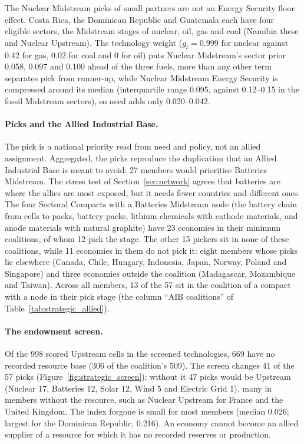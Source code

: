 The Nuclear Midstream picks of small partners are not an Energy Security floor effect. Costa Rica,
the Dominican Republic and Guatemala each have four eligible sectors, the Midstream stages of
nuclear, oil, gas and coal (Namibia these and Nuclear Upstream). The technology weight ($g_t=0.999$
for nuclear against 0.42 for gas, 0.02 for coal and 0 for oil) puts Nuclear Midstream's sector prior
0.058, 0.097 and 0.100 ahead of the three fuels, more than any other term separates pick from
runner-up, while Nuclear Midstream Energy Security is compressed around its median (interquartile
range 0.095, against 0.12--0.15 in the fossil Midstream sectors), so need adds only 0.020--0.042.

\paragraph{Picks and the Allied Industrial Base.} The pick is a national priority read from need
and policy, not an allied assignment. Aggregated, the picks reproduce the duplication that an Allied
Industrial Base is meant to avoid: 27 members would prioritise Batteries Midstream. The stress test of
Section~\ref{sec:network} agrees that batteries are where the allies are most exposed, but it needs
fewer countries and different ones. The four Sectoral Compacts with a Batteries Midstream node (the
battery chain from cells to packs, battery packs, lithium chemicals with cathode materials, and anode
materials with natural graphite) have 23 economies in their minimum coalitions, of whom 12 pick the
stage. The other 15 pickers sit in none of these coalitions, while 11 economies in them do not pick it: eight
members whose picks lie elsewhere (Canada, Chile, Hungary, Indonesia, Japan, Norway, Poland and
Singapore) and three economies outside the coalition (Madagascar, Mozambique and Taiwan). Across all
members, 13 of the 57 sit in the coalition of a compact with a node in their pick stage (the column
``AIB coalitions'' of Table~\ref{tab:strategic_allied}).



\paragraph{The endowment screen.} Of the 998 scored Upstream cells in the screened technologies,
669 have no recorded resource base (306 of the coalition's 509). The screen changes 41 of the 57
picks (Figure~\ref{fig:strategic_screen}): without it 47 picks would be Upstream (Nuclear 17,
Batteries 12, Solar 12, Wind 5 and Electric Grid 1), many in members without the resource, such as Nuclear Upstream for
France and the United Kingdom. The index forgone is small for most members (median 0.026; largest
for the Dominican Republic, 0.216). An economy cannot become an allied supplier of a resource for
which it has no recorded reserves or production.

